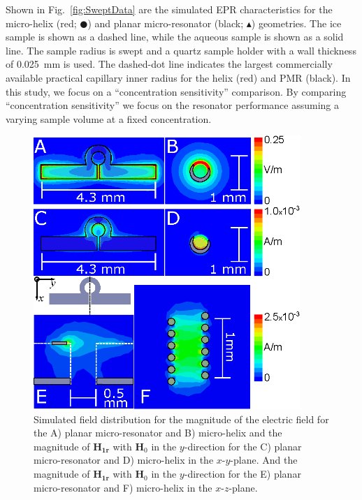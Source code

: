 Shown in Fig.~\ref{fig:SweptData} are the simulated EPR characteristics for the micro-helix (red; $\CIRCLE$) and planar micro-resonator (black; $\blacktriangle$) geometries. The ice sample is shown as a dashed line, while the aqueous sample is shown as a solid line. The sample radius is swept and a quartz sample holder with a wall thickness of 0.025~mm is used. The dashed-dot line indicates the largest commercially available practical capillary inner radius for the helix (red) and PMR (black). In this study, we focus on a ``concentration sensitivity'' comparison. By comparing ``concentration sensitivity'' we focus on the resonator performance assuming a varying sample volume at a fixed concentration.

\begin{figure}[ht]
 \centering
 \includegraphics[width=0.9\textwidth]{Kapitel/Ch2-Images/Ch2-AnsysFields.eps}
 \caption[Simulated field distribution for Helix and PMR.]{Simulated field distribution for the magnitude of the electric field for the A) planar micro-resonator and B) micro-helix and the magnitude of $\mathbf{H_{1r}}$ with $\mathbf{H}_0$ in the $y$-direction for the C) planar micro-resonator and D) micro-helix in the $x$-$y$-plane. And the magnitude of $\mathbf{H_{1r}}$ with $\mathbf{H}_0$ in the $y$-direction for the E) planar micro-resonator and F) micro-helix in the $x$-$z$-plane. }
 \label{ch2-fig:FieldData}
\end{figure}


